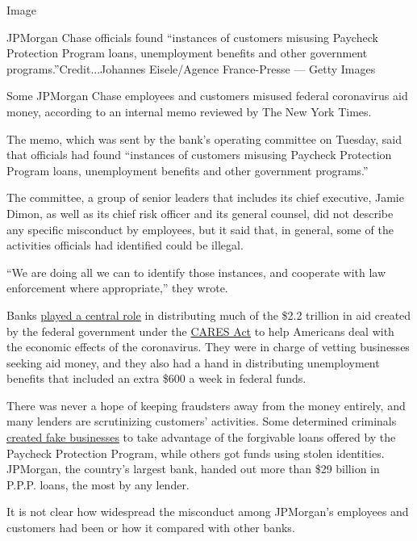 Image

JPMorgan Chase officials found ``instances of customers misusing
Paycheck Protection Program loans, unemployment benefits and other
government programs.''Credit...Johannes Eisele/Agence France-Presse ---
Getty Images

Some JPMorgan Chase employees and customers misused federal coronavirus
aid money, according to an internal memo reviewed by The New York Times.

The memo, which was sent by the bank's operating committee on Tuesday,
said that officials had found ``instances of customers misusing Paycheck
Protection Program loans, unemployment benefits and other government
programs.''

The committee, a group of senior leaders that includes its chief
executive, Jamie Dimon, as well as its chief risk officer and its
general counsel, did not describe any specific misconduct by employees,
but it said that, in general, some of the activities officials had
identified could be illegal.

``We are doing all we can to identify those instances, and cooperate
with law enforcement where appropriate,'' they wrote.

Banks
\href{https://www.nytimes3xbfgragh.onion/2020/05/11/business/coronavirus-aid-banks.html}{played
a central role} in distributing much of the \$2.2 trillion in aid
created by the federal government under the
\href{https://www.nytimes3xbfgragh.onion/2020/03/27/world/coronavirus-live-news-updates.html\#link-1900f91a}{CARES
Act} to help Americans deal with the economic effects of the
coronavirus. They were in charge of vetting businesses seeking aid
money, and they also had a hand in distributing unemployment benefits
that included an extra \$600 a week in federal funds.

There was never a hope of keeping fraudsters away from the money
entirely, and many lenders are scrutinizing customers' activities. Some
determined criminals
\href{https://www.nytimes3xbfgragh.onion/2020/08/28/business/ppp-small-business-fraud-coronavirus.html}{created
fake businesses} to take advantage of the forgivable loans offered by
the Paycheck Protection Program, while others got funds using stolen
identities. JPMorgan, the country's largest bank, handed out more than
\$29 billion in P.P.P. loans, the most by any lender.

It is not clear how widespread the misconduct among JPMorgan's employees
and customers had been or how it compared with other banks.

